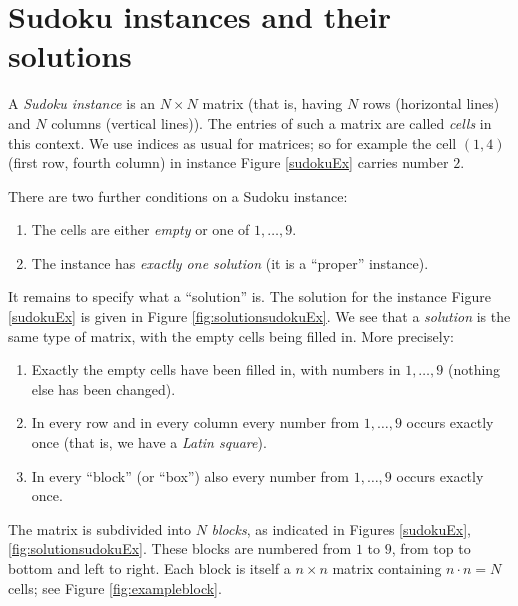 \documentclass[11pt]{report}
\begin{document}
\section{Sudoku instances and their solutions}
\label{sec:Sudokuinstances}

A \textit{Sudoku instance} is an $N \times N$ matrix (that is, having $N$ rows (horizontal lines) and $N$ columns (vertical lines)). The entries of such a matrix are called \textit{cells} in this context. We use indices as usual for matrices; so for example the cell $(1,4)$ (first row, fourth column) in instance Figure \ref{sudokuEx} carries number $2$.

There are two further conditions on a Sudoku instance:
\begin{enumerate}
\item The cells are either \emph{empty} or one of $1, \dots, 9$.
\item The instance has \emph{exactly one solution} (it is a ``proper'' instance).
\end{enumerate}

It remains to specify what a ``solution'' is. The solution for the instance Figure \ref{sudokuEx} is given in Figure \ref{fig:solutionsudokuEx}. We see that a \textit{solution} is the same type of matrix, with the empty cells being filled in. More precisely:
\begin{enumerate}
\item Exactly the empty cells have been filled in, with numbers in $1,\dots,9$ (nothing else has been changed).
\item In every row and in every column every number from $1,\dots,9$ occurs exactly once (that is, we have a \emph{Latin square}).
\item In every ``block'' (or ``box'') also every number from $1,\dots,9$ occurs exactly once.
\end{enumerate}

The matrix is subdivided into $N$ \textit{blocks}, as indicated in Figures \ref{sudokuEx}, \ref{fig:solutionsudokuEx}. These blocks are numbered from $1$ to $9$, from top to bottom and left to right. Each block is itself a $n \times n$ matrix containing $n \cdot n = N$ cells; see Figure \ref{fig:exampleblock}.
\end{document}
